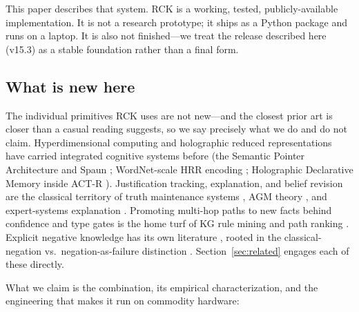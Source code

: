 \documentclass[11pt]{article}
\begin{document}
This paper describes that system. RCK is a working, tested,
publicly-available implementation. It is not a research prototype; it
ships as a Python package and runs on a laptop. It is also not
finished---we treat the release described here (v15.3) as a stable
foundation rather than a final form.

\subsection{What is new here}

The individual primitives RCK uses are not new---and the closest
prior art is closer than a casual reading suggests, so we say
precisely what we do and do not claim. Hyperdimensional computing
\cite{kanerva2009} and holographic reduced representations
\cite{plate1995} have carried integrated cognitive systems before
(the Semantic Pointer Architecture and Spaun
\cite{eliasmith2012spaun, eliasmith2013}; WordNet-scale HRR encoding
\cite{crawford2016}; Holographic Declarative Memory inside ACT-R
\cite{kelly2020hdm}). Justification tracking, explanation, and belief
revision are the classical territory of truth maintenance systems
\cite{doyle1979tms, dekleer1986atms}, AGM theory \cite{agm1985}, and
expert-systems explanation \cite{buchanan1984mycin}. Promoting
multi-hop paths to new facts behind confidence and type gates is the
home turf of KG rule mining and path ranking
\cite{galarraga2013amie, lao2010pra, carlson2010nell}. Explicit
negative knowledge has its own literature
\cite{arnaout2020, safavi2021negater}, rooted in the
classical-negation vs.\ negation-as-failure distinction
\cite{clark1978, gelfond1991}. Section~\ref{sec:related} engages each
of these directly.

What we claim is the combination, its empirical characterization,
and the engineering that makes it run on commodity hardware:
\end{document}
